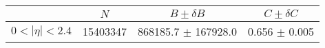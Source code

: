 \begin{tabular}{lccc}
\hline
    &   $N$   & $B \pm \delta B$  &  $C \pm \delta C$ \\
\hline
$0 < |\eta| <2.4$              & 15403347   & 868185.7   $\pm$ 167928.0 & 0.656      $\pm$ 0.005 \\
\hline
\end{tabular}

